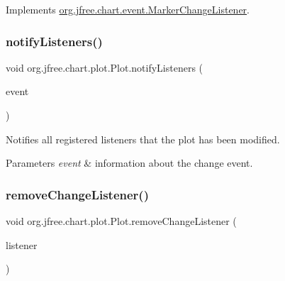 Implements \mbox{\hyperlink{interfaceorg_1_1jfree_1_1chart_1_1event_1_1_marker_change_listener_a0797552ac12ca77a9ddd96cfe5abb60e}{org.\+jfree.\+chart.\+event.\+Marker\+Change\+Listener}}.

\mbox{\label{classorg_1_1jfree_1_1chart_1_1plot_1_1_plot_a2c2743526c7bcd6c548bfdef793a34f5}} 
\subsubsection{\texorpdfstring{notify\+Listeners()}{notifyListeners()}}
{\footnotesize\ttfamily void org.\+jfree.\+chart.\+plot.\+Plot.\+notify\+Listeners (\begin{DoxyParamCaption}\item[{\mbox{\hyperlink{classorg_1_1jfree_1_1chart_1_1event_1_1_plot_change_event}{Plot\+Change\+Event}}}]{event }\end{DoxyParamCaption})}

Notifies all registered listeners that the plot has been modified.


\begin{DoxyParams}{Parameters}
{\em event} & information about the change event. \\
\hline
\end{DoxyParams}
\mbox{\label{classorg_1_1jfree_1_1chart_1_1plot_1_1_plot_a22b9d9efffe33edd36a3b7999ee5e1fd}} 
\subsubsection{\texorpdfstring{remove\+Change\+Listener()}{removeChangeListener()}}
{\footnotesize\ttfamily void org.\+jfree.\+chart.\+plot.\+Plot.\+remove\+Change\+Listener (\begin{DoxyParamCaption}\item[{\mbox{\hyperlink{interfaceorg_1_1jfree_1_1chart_1_1event_1_1_plot_change_listener}{Plot\+Change\+Listener}}}]{listener }\end{DoxyParamCaption})}

